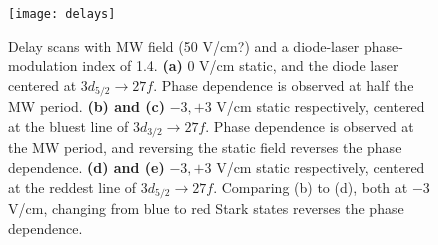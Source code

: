 \documentclass{article}
\begin{document}
\begin{figure}
	\texttt{[image: delays]}
	\caption{Delay scans with MW field (50 V/cm?) and a diode-laser phase-modulation index of 1.4.
	\textbf{(a)} 0 V/cm static, and the diode laser centered at $3d_{5/2} \rightarrow 27f$. Phase dependence is observed at half the MW period.
	\textbf{(b) and (c)} $-3, +3$ V/cm static respectively, centered at the bluest line of $3d_{3/2} \rightarrow 27f$. Phase dependence is observed at the MW period, and reversing the static field reverses the phase dependence.
	\textbf{(d) and (e)} $-3, +3$ V/cm static respectively, centered at the reddest line of $3d_{5/2} \rightarrow 27f$. Comparing (b) to (d), both at $-3$ V/cm, changing from blue to red Stark states reverses the phase dependence.}
	\label{fig:del}
\end{figure}
\end{document}
